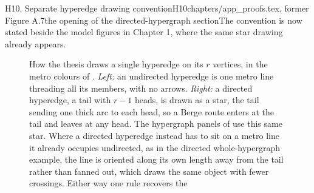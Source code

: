 \begin{offcut}{H10. Separate hyperedge drawing convention}{H10}{chapters/app\_proofs.tex, former Figure A.7}{the opening of the directed-hypergraph section}{The convention is now stated beside the model figures in Chapter 1, where the same star drawing already appears.}
\begin{figure}[htbp]
\centering
{}
\caption[Drawing a hyperedge]{How the thesis draws a single hyperedge on its $r$
vertices, in the metro colours of . \emph{Left:} an
undirected hyperedge is one metro line threading all its members, with no arrows.
\emph{Right:} a directed hyperedge, a tail with $r-1$ heads, is drawn as a star,
the tail sending one thick arc to each head, so a Berge route enters at the tail
and leaves at any head. The hypergraph panels of 
use this same star. Where a directed hyperedge instead has to sit on a metro line
it already occupies undirected, as in the directed whole-hypergraph example, the
line is oriented along its own length away from the tail rather than fanned out,
which draws the same object with fewer crossings. Either way one rule recovers the
}
\end{figure}
\end{offcut}
